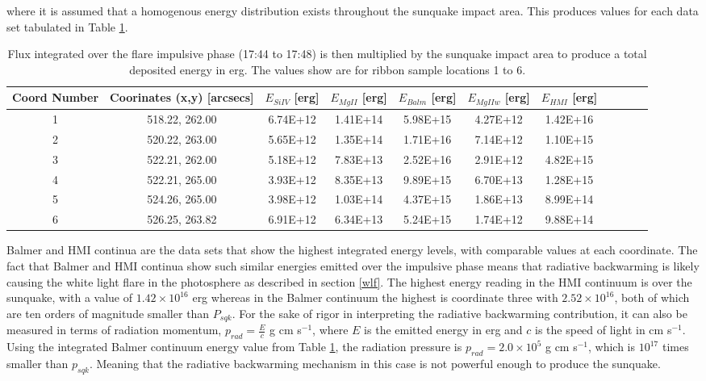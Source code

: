 where it is assumed that a homogenous energy distribution exists throughout the sunquake impact area. This produces values for each data set tabulated in Table \ref{eimp}. 


\begin{table}[h]
\centering
\begin{tabular}{|c|c|c|c|c|c|c|c|c|c|c|}
Coord Number & Coorinates (x,y) [arcsecs] & $E_{Si IV}$ [erg] & $E_{Mg II}$ [erg] & $E_{Balm}$ [erg] & $E_{Mg II w}$ [erg] & $E_{HMI}$ [erg]\\
\hline
1 & 518.22, 262.00 & 6.74E+12 & 1.41E+14 & 5.98E+15 & 4.27E+12 & 1.42E+16\\
2 & 520.22, 263.00 & 5.65E+12 & 1.35E+14 & 1.71E+16 & 7.14E+12 & 1.10E+15\\
3 & 522.21, 262.00 & 5.18E+12 & 7.83E+13 & 2.52E+16 & 2.91E+12 & 4.82E+15\\
4 & 522.21, 265.00 & 3.93E+12 & 8.35E+13 & 9.89E+15 & 6.70E+13 & 1.28E+15\\
5 & 524.26, 265.00 & 3.98E+12 & 1.03E+14 & 4.37E+15 & 1.86E+13 & 8.99E+14\\
6 & 526.25, 263.82 & 6.91E+12 & 6.34E+13 & 5.24E+15 & 1.74E+12 & 9.88E+14\\
\end{tabular}
\caption{Flux integrated over the flare impulsive phase (17:44 to 17:48) is then multiplied by the sunquake impact area to produce a total deposited energy in erg. The values show are for ribbon sample locations 1 to 6.}\label{eimp}
\end{table}

Balmer and HMI continua are the data sets that show the highest integrated energy levels, with comparable values at each coordinate. The fact that Balmer and HMI continua show such similar energies emitted over the impulsive phase means that radiative backwarming is likely causing the white light flare in the photosphere as described in section \ref{wlf}. The highest energy reading in the HMI continuum is over the sunquake, with a value of $1.42{\times}10^{16}$ erg whereas in the Balmer continuum the highest is coordinate three with $2.52{\times}10^{16}$, both of which are ten orders of magnitude smaller than $P_{sqk}$. For the sake of rigor in interpreting the radiative backwarming contribution, it can also be measured in terms of radiation momentum, $p_{rad}=\frac{E}{c}$ g cm s$^{-1}$, where $E$ is the emitted energy in erg and $c$ is the speed of light in cm s$^{-1}$. Using the integrated Balmer continuum energy value from Table \ref{eimp}, the radiation pressure is $p_{rad} = 2.0{\times}10^{5}$ g cm s$^{-1}$, which is $10^{17}$ times smaller than $p_{sqk}$. Meaning that the radiative backwarming mechanism in this case is not powerful enough to produce the sunquake. \\ 



